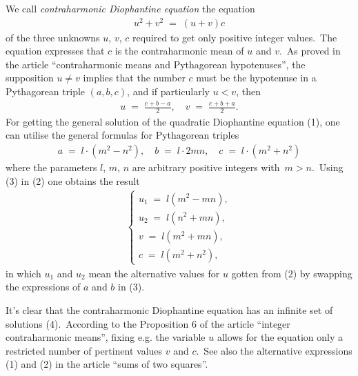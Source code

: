\documentclass[12pt]{article}
\begin{document}
We call {\it contraharmonic Diophantine equation} the equation
\begin{align}
u^2+v^2 \;=\; (u+v)c
\end{align}
of the three unknowns $u$, $v$, $c$ required to get only positive integer 
values.\, The equation expresses that $c$ is the contraharmonic 
mean of $u$ and $v$.\, As proved in the article 
``contraharmonic means and Pythagorean 
hypotenuses'', the supposition $u \neq v$ implies that the 
number $c$ must be the hypotenuse in a Pythagorean triple
$(a, b, c)$, and if particularly $u < v$, then
\begin{align}
u \;=\; \frac{c+b-a}{2}, \quad v \;=\; \frac{c+b+a}{2}.
\end{align}
For getting the general solution of the quadratic Diophantine 
equation (1), one can utilise the general formulas for 
Pythagorean triples
\begin{align}
a \;=\; l\!\cdot\!(m^2-n^2), \quad b \;=\; l\!\cdot\!2mn, 
\quad c \;=\; l\!\cdot\!(m^2+n^2)
\end{align}
where the parameters $l$, $m$, $n$ are arbitrary positive 
integers with\, $m > n$.\, Using (3) in (2) one obtains the 
result
\begin{align}
\begin{cases}
  u_1 \;=\; l(m^2-mn),\\
  u_2 \;=\; l(n^2+mn),\\
  v \;=\; l(m^2+mn),\\
  c \;=\; l(m^2+n^2), 
\end{cases}
\end{align}
in which $u_1$ and $u_2$ mean the alternative values for $u$ gotten from (2) by swapping 
the expressions of $a$ and $b$ in (3). 

It's clear that the contraharmonic Diophantine equation has an 
infinite set of solutions (4).\, According to the Proposition 
6 of the article ``integer contraharmonic means'', fixing e.g. 
the variable $u$ allows for the equation only a restricted 
number of pertinent values $v$ and $c$.\, See also the 
alternative expressions (1) and (2) in the article ``sums of 
two squares''.\\
\end{document}
